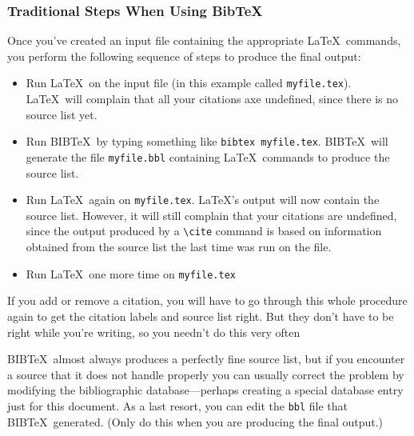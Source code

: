 \documentclass{article}
\begin{document}
\subsubsection{Traditional Steps When Using Bib\TeX}

Once you've created an input file containing the appropriate \LaTeX\ commands, you perform the
following sequence of steps to produce the final output:

\begin{itemize}
   \item Run \LaTeX\ on the input file (in this example called \texttt{myfile.tex}). \LaTeX\ will
    complain that all your citations axe undefined, since there is no source list yet.

   \item Run BIB\TeX\ by typing something like \texttt{bibtex myfile.tex}. BIB\TeX\ will generate
    the file \texttt{myfile.bbl} containing \LaTeX\ commands to produce the source list.
   
   \item Run \LaTeX\ again on \texttt{myfile.tex}. \LaTeX's output will now contain the source list.
    However, it will still complain that your citations are undefined, since the output produced by
    a \verb:\cite: command is based on information obtained from the source list the last time was
    run on the file.

   \item Run \LaTeX\ one more time on \texttt{myfile.tex}
\end{itemize}

If you add or remove a citation, you will have to go through this whole procedure again to get the
citation labels and source list right. But they don't have to be right while you're writing, so you
needn't do this very often

BIB\TeX\ almost always produces a perfectly fine source list, but if you encounter a source that it
does not handle properly you can usually correct the problem by modifying the bibliographic
database---perhaps creating a special database entry just for this document. As a last resort, you
can edit the \texttt{bbl} file that BIB\TeX\ generated. (Only do this when you are producing the
final output.)


\end{document}
